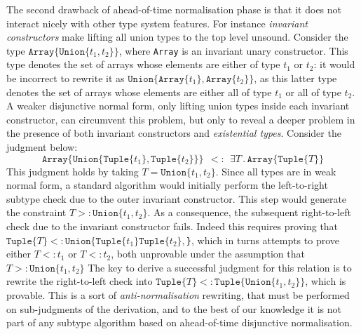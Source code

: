 \documentclass[a4paper,english]{lipics-v2018}
\newcommand{\xt}[1]{\texttt{#1}}
\newcommand{\union}[2]{\xt{Union\{}#1,#2\xt{\}}}
\newcommand{\tuple}[1]{\xt{Tuple\{}#1\xt{\}}}
\newcommand{\arrayt}[1]{\xt{Array\{}#1\xt{\}}}
\begin{document}
The second drawback of ahead-of-time normalisation phase is that it
does not interact nicely with other type system features. For instance
\emph{invariant constructors} make lifting all union types to the top
level unsound.
Consider the type \(\arrayt{\union{t_1}{t_2}}\), where \texttt{Array}
is an invariant unary constructor.  This type
denotes the set of arrays whose elements are either of type \(t_1\) or
\(t_2\): it would be incorrect to rewrite it as
\(\union{\arrayt{t_1}}{\arrayt{t_2}}\),
as this latter type denotes the set of arrays
whose elements are either all of type \(t_1\) or all of type
\(t_2\).  A weaker disjunctive normal form, only lifting union types inside
each invariant constructor, can circumvent this
problem, but only to reveal a deeper problem in the presence of
 both invariant constructors and \emph{existential types}.
Consider the judgment below:
\[
  \arrayt{\union{\tuple{t_1}}{\tuple{t_2}}} \ \ <:\ \ \exists T\,.\, \arrayt{\tuple{T}}
\]
This judgment holds by taking \(T = \union{t_1}{t_2}\).  Since all
types are in weak normal form, a standard algorithm would initially
perform the left-to-right subtype check due to the outer invariant
constructor.  This step would generate the constraint \(T >:
\union{t_1}{t_2}\).  As a consequence, the subsequent right-to-left
check due to the invariant constructor fails.  Indeed this requires
proving that \(\tuple{T} <: \union{\tuple{t_1}\tuple{t_2}}\), which
in turns attempts to prove either \(T <: t_1\) or \(T <: t_2\),
both unprovable under the assumption that \(T >: \union{t_1}{t_2}\)
The key to derive a successful judgment for this relation is to rewrite the
right-to-left check into \(\tuple{T} <: \tuple{\union{t_1}{t_2}}\),
which is provable. This is a sort of \emph{anti-normalisation} rewriting, that
must be performed on sub-judgments of the derivation, and to the best
of our knowledge it is not part
of any subtype algorithm based on ahead-of-time disjunctive normalisation.


\end{document}

